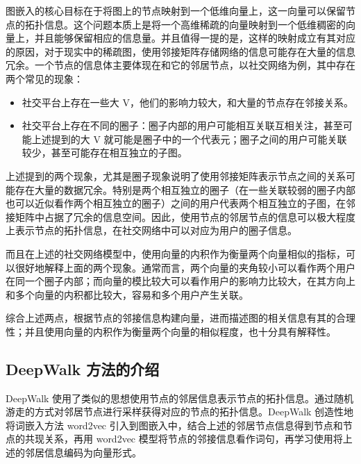 \documentclass{ctexart}
\begin{document}
图嵌入的核心目标在于将图上的节点映射到一个低维向量上，这一向量可以保留节点的拓扑信息。这个问题本质上是将一个高维稀疏的向量映射到一个低维稠密的向量上，并且能够保留相应的信息量。并且值得一提的是，这样的映射成立有其对应的原因，对于现实中的稀疏图，使用邻接矩阵存储网络的信息可能存在大量的信息冗余。一个节点的信息体主要体现在和它的邻居节点，以社交网络为例，其中存在两个常见的现象：

\begin{itemize}
    \item 社交平台上存在一些大 V，他们的影响力较大，和大量的节点存在邻接关系。
    \item 社交平台上存在不同的圈子：圈子内部的用户可能相互关联互相关注，甚至可能上述提到的大 V 就可能是圈子中的一个代表元；圈子之间的用户可能关联较少，甚至可能存在相互独立的子图。
\end{itemize}

上述提到的两个现象，尤其是圈子现象说明了使用邻接矩阵表示节点之间的关系可能存在大量的数据冗余。特别是两个相互独立的圈子（在一些关联较弱的圈子内部也可以近似看作两个相互独立的圈子）之间的用户代表两个相互独立的子图，在邻接矩阵中占据了冗余的信息空间。因此，使用节点的邻居节点的信息可以极大程度上表示节点的拓扑信息，在社交网络中可以对应为用户的圈子信息。

而且在上述的社交网络模型中，使用向量的内积作为衡量两个向量相似的指标，可以很好地解释上面的两个现象。通常而言，两个向量的夹角较小可以看作两个用户在同一个圈子内部；而向量的模比较大可以看作用户的影响力比较大，在其方向上和多个向量的内积都比较大，容易和多个用户产生关联。

综合上述两点，根据节点的邻接信息构建向量，进而描述图的相关信息有其的合理性；并且使用向量的内积作为衡量两个向量的相似程度，也十分具有解释性。

\subsection{DeepWalk 方法的介绍}

DeepWalk 使用了类似的思想使用节点的邻居信息表示节点的拓扑信息。通过随机游走的方式对邻居节点进行采样获得对应的节点的拓扑信息。DeepWalk 创造性地将词嵌入方法 word2vec 引入到图嵌入中，结合上述的邻居节点信息得到节点和节点的共现关系，再用 word2vec 模型将节点的邻接信息看作词句，再学习使用将上述的邻居信息编码为向量形式。


\end{document}
